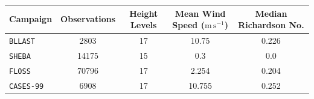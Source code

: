 \begin{tabular}{lcccc}
\toprule
\textbf{Campaign} & \textbf{Observations} & \textbf{Height Levels} & \textbf{Mean Wind Speed ($\mathrm{m\,s^{-1}}$)} & \textbf{Median Richardson No.} \\
\midrule
\texttt{BLLAST} & 2803 & 17 & 10.75 & 0.226 \\
\texttt{SHEBA} & 14175 & 15 & 0.3 & 0.0 \\
\texttt{FLOSS} & 70796 & 17 & 2.254 & 0.204 \\
\texttt{CASES-99} & 6908 & 17 & 10.755 & 0.252 \\
\bottomrule
\end{tabular}
